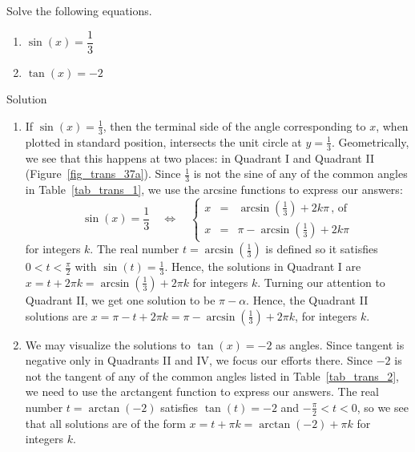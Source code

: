 \begin{example}  \label{basicinverseeqns}  Solve the following equations.

\begin{multicols}{2}

\begin{enumerate}

\item  $\sin(x) = \dfrac{1}{3}$

\item $\tan(x) = -2$
\end{enumerate}
\end{multicols}


Solution 

\begin{enumerate}

\item  If $\sin(x) = \frac{1}{3}$, then the terminal side of the angle corresponding to $x$, when plotted in standard position, intersects the unit circle at $y = \frac{1}{3}$.  Geometrically, we see that this happens at two places:  in Quadrant I and Quadrant II (Figure~\ref{fig_trans_37a}). Since $\frac{1}{3}$ is not the sine of any of the common angles in Table~\ref{tab_trans_1}, we use the arcsine functions to express our answers:
$$
\sin(x)=\dfrac{1}{3}\quad\Leftrightarrow\quad
\left\{\begin{array}{rcl}
     x&=&\arcsin\left(\frac{1}{3}\right)+2k\pi\,\text{, of}  \\[0.2cm]
     x&=&\pi-\arcsin\left(\frac{1}{3}\right)+2k\pi 
\end{array}\right.
$$
for integers $k$.
The real number $t = \arcsin\left(\frac{1}{3}\right)$ is defined so it satisfies $0 < t < \frac{\pi}{2}$ with $\sin(t) = \frac{1}{3}$.  Hence,  the solutions in Quadrant I are $x = t + 2\pi k  = \arcsin\left(\frac{1}{3}\right) + 2\pi k$ for integers $k$.  Turning our attention to Quadrant II, we get one solution to be $\pi - \alpha$.  Hence, the Quadrant II solutions are  $x = \pi - t + 2\pi k = \pi - \arcsin\left(\frac{1}{3}\right) + 2\pi k$, for integers $k$.

\item We may visualize the solutions to $\tan(x)=-2$ as angles.  Since tangent is negative only in Quadrants II and IV, we focus our efforts there. Since $-2$ is not the tangent of any of the common angles listed in Table~\ref{tab_trans_2}, we need to use the arctangent function to express our answers.  The real number $t = \arctan(-2)$ satisfies $\tan(t)=-2$  and $-\frac{\pi}{2} < t < 0$, so we see that all solutions are of the form $x = t + \pi k = \arctan(-2) + \pi k$ for integers $k$. 


\end{enumerate}
\end{example}

